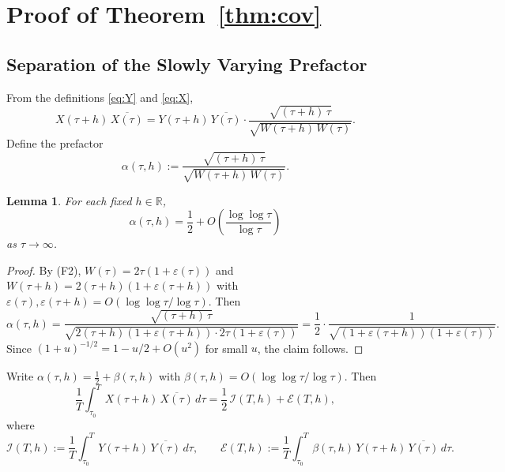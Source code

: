 \documentclass[11pt]{article}
\theoremstyle{plain}
\newtheorem{lemma}[theorem]{Lemma}
\theoremstyle{definition}
\newcommand{\assign}{:=}
\newcommand{\RR}{\mathbb{R}}
\begin{document}
\section{Proof of Theorem~\ref{thm:cov}}

\subsection*{Separation of the Slowly Varying Prefactor}

From the definitions \eqref{eq:Y} and \eqref{eq:X},
\begin{equation}\label{eq:XbarX}
X(\tau+h)\,\overline{X(\tau)}
= Y(\tau+h)\,\overline{Y(\tau)}
\cdot
\frac{\sqrt{(\tau+h)\,\tau}}
     {\sqrt{W(\tau+h)\,W(\tau)}}.
\end{equation}
Define the prefactor
\begin{equation}\label{eq:alpha-def}
\alpha(\tau,h)
\assign
\frac{\sqrt{(\tau+h)\,\tau}}
     {\sqrt{W(\tau+h)\,W(\tau)}}.
\end{equation}

\begin{lemma}\label{lem:alpha}
For each fixed $h\in\RR$,
\[
\alpha(\tau,h)
= \frac{1}{2} + O\!\left(\frac{\log\log\tau}{\log\tau}\right)
\]
as $\tau\to\infty$.
\end{lemma}

\begin{proof}
By (F2), $W(\tau)=2\tau(1+\varepsilon(\tau))$ and
$W(\tau+h)=2(\tau+h)(1+\varepsilon(\tau+h))$
with $\varepsilon(\tau),\varepsilon(\tau+h)=O(\log\log\tau/\log\tau)$.
Then
\[
\alpha(\tau,h)
= \frac{\sqrt{(\tau+h)\,\tau}}
       {\sqrt{2(\tau+h)(1+\varepsilon(\tau+h))\cdot 2\tau(1+\varepsilon(\tau))}}
= \frac{1}{2}\cdot
  \frac{1}{\sqrt{(1+\varepsilon(\tau+h))(1+\varepsilon(\tau))}}.
\]
Since $(1+u)^{-1/2}=1-u/2+O(u^2)$ for small $u$,
the claim follows.
\end{proof}

Write $\alpha(\tau,h)=\frac{1}{2}+\beta(\tau,h)$
with $\beta(\tau,h)=O(\log\log\tau/\log\tau)$.
Then
\begin{equation}\label{eq:split}
\frac{1}{T}\int_{\tau_0}^T X(\tau+h)\,\overline{X(\tau)}\,d\tau
= \frac{1}{2}\,\mathcal{I}(T,h) + \mathcal{E}(T,h),
\end{equation}
where
\[
\mathcal{I}(T,h)
\assign
\frac{1}{T}\int_{\tau_0}^T Y(\tau+h)\,\overline{Y(\tau)}\,d\tau,
\qquad
\mathcal{E}(T,h)
\assign
\frac{1}{T}\int_{\tau_0}^T
\beta(\tau,h)\,Y(\tau+h)\,\overline{Y(\tau)}\,d\tau.
\]
\end{document}

